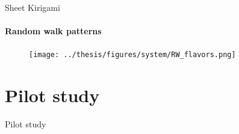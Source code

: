 \documentclass[
	10pt, %
]{beamer}
\renewcommand{\vec}[1]{\mathbf{#1}} %
\begin{document}
%
%
\begin{frame}{Sheet Kirigami}
	\framesubtitle{Random walk patterns}
	\begin{figure}[H]
		\centering
		\texttt{[image: ../thesis/figures/system/RW\_flavors.png]}
	\end{figure}
\end{frame}
%
%



\section{Pilot study} %
\begin{frame}{Pilot study}
    \tableofcontents[currentsection]
\end{frame}
\end{document}
